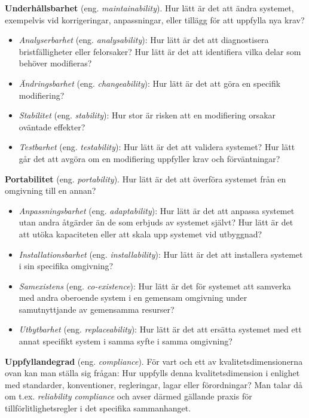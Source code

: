 \textbf{Underhållsbarhet} (eng. \emph{maintainability}). Hur lätt är det
att ändra systemet, exempelvis vid korrigeringar, anpassningar, eller
tillägg för att uppfylla nya krav?

\begin{itemize}
\item
  \emph{Analyserbarhet} (eng. \emph{analysability}): Hur lätt är det att
  diagnostisera bristfälligheter eller felorsaker? Hur lätt är det att
  identifiera vilka delar som behöver modifieras?
\item
  \emph{Ändringsbarhet} (eng. \emph{changeability}): Hur lätt är det att
  göra en specifik modifiering?
\item
  \emph{Stabilitet} (eng. \emph{stability}): Hur stor är risken att en
  modifiering orsakar oväntade effekter?
\item
  \emph{Testbarhet} (eng. \emph{testability}): Hur lätt är det att
  validera systemet? Hur lätt går det att avgöra om en modifiering
  uppfyller krav och förväntningar?
\end{itemize}

\textbf{Portabilitet} (eng. \emph{portability}). Hur lätt är det att
överföra systemet från en omgivning till en annan?

\begin{itemize}
\item
  \emph{Anpassningsbarhet} (eng. \emph{adaptability}): Hur lätt är det
  att anpassa systemet utan andra åtgärder än de som erbjuds av systemet
  självt? Hur lätt är det att utöka kapaciteten eller att skala upp
  systemet vid utbyggnad?
\item
  \emph{Installationsbarhet} (eng. \emph{installability}): Hur lätt är
  det att installera systemet i sin specifika omgivning?
\item
  \emph{Samexistens} (eng. \emph{co-existence}): Hur lätt är det för
  systemet att samverka med andra oberoende system i en gemensam
  omgivning under samutnyttjande av gemensamma resurser?
\item
  \emph{Utbytbarhet} (eng. \emph{replaceability}): Hur lätt är det att
  ersätta systemet med ett annat specifikt system i samma syfte i samma
  omgivning?
\end{itemize}

\textbf{Uppfyllandegrad} (eng. \emph{compliance}). För vart och ett av
kvalitetsdimensionerna ovan kan man ställa sig frågan: Hur uppfylls
denna kvalitetsdimension i enlighet med standarder, konventioner,
regleringar, lagar eller förordningar? Man talar då om t.ex.
\emph{reliability compliance} och avser därmed gällande praxis för
tillförlitlighetsregler i det specifika sammanhanget.

